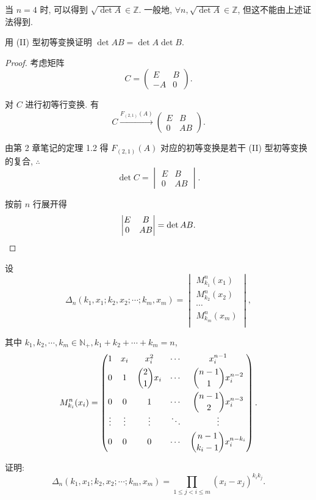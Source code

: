 \documentclass{ctexart}
\begin{document}
\begin{note}
    当 $n=4$ 时, 可以得到 $\sqrt{\det A}\in\mathbb{Z}$. 一般地, $\forall n,\sqrt{\det A}\in\mathbb{Z}$, 但这不能由上述证法得到.
\end{note}
\begin{exercise}
    用 (II) 型初等变换证明 $\det AB=\det A\det B$.
\end{exercise}
\begin{proof}
    考虑矩阵
    \[C=\begin{pmatrix}
        E & B \\
        -A & 0
    \end{pmatrix}.\]

    对 $C$ 进行初等行变换. 有
    \[C\xrightarrow{F_{(2,1)}(A)}\begin{pmatrix}
        E & B \\
        0 & AB
    \end{pmatrix}.\]

    由第 2 章笔记的定理 1.2 得 $F_{(2,1)}(A)$ 对应的初等变换是若干 (II) 型初等变换的复合, $\therefore$
    \[\det C=\begin{vmatrix}
        E & B \\
        0 & AB
    \end{vmatrix}.\]

    按前 $n$ 行展开得
    \[\begin{vmatrix}
        E & B \\
        0 & AB
    \end{vmatrix}=\det AB.\qedhere\]
\end{proof}
\begin{exercise}%
    设
    \[\Delta_n(k_1,x_1;k_2,x_2;\cdots;k_m,x_m)=\begin{vmatrix}
        M_{k_1}^n(x_1) \\
        M_{k_2}^n(x_2) \\
        \cdots \\
        M_{k_m}^n(x_m) \\
    \end{vmatrix},\]

    其中 $k_1,k_2,\cdots,k_m\in\mathbb{N}_+,k_1+k_2+\cdots+k_m=n$,
    \[M_{k_i}^n(x_i)=\begin{pmatrix}
        1 & x_i & x_i^2 & \cdots & x_i^{n-1} \\[4pt]
        0 & 1 & \dbinom{2}{1}x_i & \cdots & \dbinom{n-1}{1}x_i^{n-2} \\[10pt]
        0 & 0 & 1 & \cdots & \dbinom{n-1}{2}x_i^{n-3} \\
        \vdots & \vdots & \vdots & \ddots & \vdots \\[4pt]
        0 & 0 & 0 & \cdots & \dbinom{n-1}{k_i-1}x_i^{n-k_i} \\
    \end{pmatrix}.\]

    证明:
    \[\Delta_n(k_1,x_1;k_2,x_2;\cdots;k_m,x_m)=\prod\limits_{1\leq j<i\leq m}(x_i-x_j)^{k_ik_j}.\]
\end{exercise}
\end{document}
